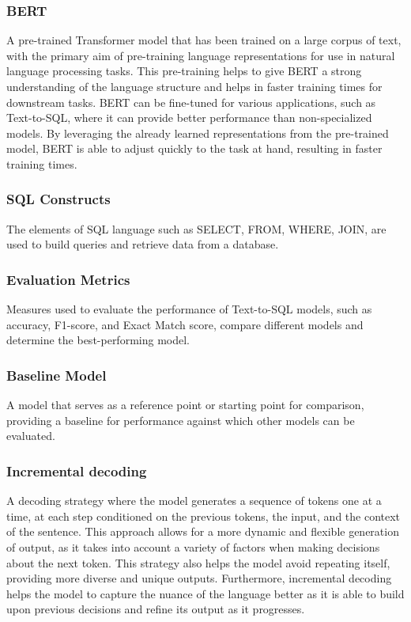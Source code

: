 \subsubsection{\ac{BERT}}

A pre-trained Transformer model that has been trained on a large corpus of text, with the primary aim of pre-training language representations for use in natural language processing tasks\cite{devlin-etal-2019-bert}. This pre-training helps to give BERT a strong understanding of the language structure and helps in faster training times for downstream tasks. BERT can be fine-tuned for various applications, such as Text-to-SQL, where it can provide better performance than non-specialized models. By leveraging the already learned representations from the pre-trained model, BERT is able to adjust quickly to the task at hand, resulting in faster training times.

\subsubsection{SQL Constructs}

The elements of SQL language such as SELECT, FROM, WHERE, JOIN, are used to build queries and retrieve data from a database.

\subsubsection{Evaluation Metrics}

Measures used to evaluate the performance of Text-to-SQL models, such as accuracy, F1-score, and Exact Match score, compare different models and determine the best-performing model.

\subsubsection{Baseline Model}

A model that serves as a reference point or starting point for comparison, providing a baseline for performance against which other models can be evaluated.

\subsubsection{Incremental decoding}

A decoding strategy where the model generates a sequence of tokens one at a time, at each step conditioned on the previous tokens, the input, and the context of the sentence. This approach allows for a more dynamic and flexible generation of output, as it takes into account a variety of factors when making decisions about the next token. This strategy also helps the model avoid repeating itself, providing more diverse and unique outputs. Furthermore, incremental decoding helps the model to capture the nuance of the language better as it is able to build upon previous decisions and refine its output as it progresses\cite{huang-mi-2010-efficient}.

